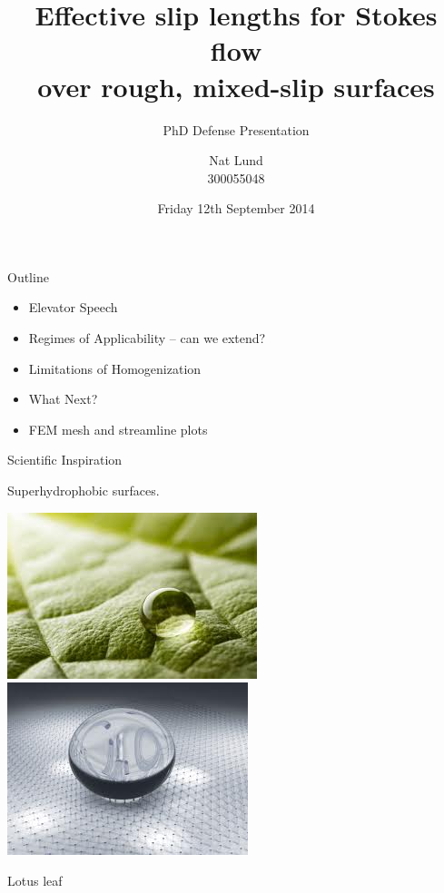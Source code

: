 \documentclass{beamer}
\title{Effective slip lengths for Stokes flow \\ over rough, mixed-slip surfaces}
\subtitle{\color{red}PhD Defense Presentation}
\author{Nat Lund \\ 300055048}
\institute{Victoria University of Wellington}
\date{Friday 12th September 2014}
\begin{document}
\begin{frame}
\maketitle
\end{frame}


\begin{frame}{Outline}

\begin{itemize}
\item Elevator Speech
\item Regimes of Applicability -- can we extend?
\item Limitations of Homogenization
\item What Next?
\item FEM mesh and streamline plots
\end{itemize}

\end{frame}


\begin{frame}{Scientific Inspiration}

Superhydrophobic surfaces.
\begin{center}
\includegraphics[scale=0.52]{lotus-leaf.jpg}
\phantom{gap}
\includegraphics[scale=0.5]{superhydrophobic.jpg}
\end{center}
Lotus leaf

\end{frame}
\end{document}
